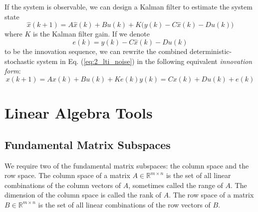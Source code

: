 If the system is observable, we can design a Kalman filter to estimate the system state \cite{kalman1960new}
\begin{equation*}
\hat{x}(k+1) = A\hat{x}(k) + Bu(k) + K\big(y(k) - C\hat{x}(k) - Du(k)\big)
\end{equation*}
where $K$ is the Kalman filter gain. If we denote 
\begin{equation*}
e(k) = y(k) - C\hat{x}(k) - Du(k)
\end{equation*}
to be the innovation sequence, we can rewrite the combined deterministic-stochastic system in Eq. (\ref{eq:2_lti_noise}) in the following equivalent \textit{innovation form}:
\begin{subequations}\label{eq:2_innovation}
\begin{equation}x(k+1) = Ax(k) + Bu(k) + Ke(k)\end{equation}
\begin{equation}y(k) = Cx(k) + Du(k) + e(k)\end{equation}
\end{subequations}

\section{Linear Algebra Tools}

\subsection{Fundamental Matrix Subspaces}
We require two of the fundamental matrix subspaces: the column space and the row space. The column space of a matrix $A \in \mathbb{R}^{m\times n}$ is the set of all linear combinations of the column vectors of $A$, sometimes called the range of $A$. The dimension of the column space is called the rank of $A$. The row space of a matrix $B \in \mathbb{R}^{m\times n}$ is the set of all linear combinations of the row vectors of $B$.


